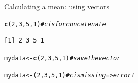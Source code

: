 \documentclass[10pt]{beamer}\usepackage[]{graphicx}\usepackage[]{color}
\makeatletter
\newcommand{\hlnum}[1]{\textcolor[rgb]{0.686,0.059,0.569}{#1}}%
\newcommand{\hlcom}[1]{\textcolor[rgb]{0.678,0.584,0.686}{\textit{#1}}}%
\newcommand{\hlstd}[1]{\textcolor[rgb]{0.345,0.345,0.345}{#1}}%
\newcommand{\hlkwb}[1]{\textcolor[rgb]{0.69,0.353,0.396}{#1}}%
\newcommand{\hlkwd}[1]{\textcolor[rgb]{0.737,0.353,0.396}{\textbf{#1}}}%
\newenvironment{kframe}{%
 \def\at@end@of@kframe{}%
 \ifinner\ifhmode%
  \def\at@end@of@kframe{\end{minipage}}%
  \begin{minipage}{\columnwidth}%
 \fi\fi%
 \def\FrameCommand##1{\hskip\@totalleftmargin \hskip-\fboxsep
 \colorbox{shadecolor}{##1}\hskip-\fboxsep
     \hskip-\linewidth \hskip-\@totalleftmargin \hskip\columnwidth}%
 \MakeFramed {\advance\hsize-\width
   \@totalleftmargin\z@ \linewidth\hsize
   \@setminipage}}%
 {\par\unskip\endMakeFramed%
 \at@end@of@kframe}
\newenvironment{knitrout}{}{} %
\makeatother
\begin{document}
\begin{frame}[fragile]{Calculating a mean: using vectors}

\begin{knitrout}
\color{fgcolor}\begin{kframe}
\begin{alltt}
  \hlkwd{c}\hlstd{(}\hlnum{2}\hlstd{,}\hlnum{3}\hlstd{,}\hlnum{5}\hlstd{,}\hlnum{1}\hlstd{)} \hlcom{# c is for concatenate}
\end{alltt}
\begin{verbatim}
[1] 2 3 5 1
\end{verbatim}
\end{kframe}
\end{knitrout}
\pause
\begin{knitrout}
\color{fgcolor}\begin{kframe}
\begin{alltt}
 \hlstd{mydata} \hlkwb{<-} \hlkwd{c}\hlstd{(}\hlnum{2}\hlstd{,}\hlnum{3}\hlstd{,}\hlnum{5}\hlstd{,}\hlnum{1}\hlstd{)} \hlcom{# save the vector}
\end{alltt}
\end{kframe}
\end{knitrout}
\pause
\begin{knitrout}
\color{fgcolor}\begin{kframe}
\begin{alltt}
  mydata <- (2,3,5,1) \hlcom{# c is missing => error!}
\end{alltt}


{\ttfamily\noindent\bfseries{}}\end{kframe}
\end{knitrout}
\end{frame}



\end{document}
